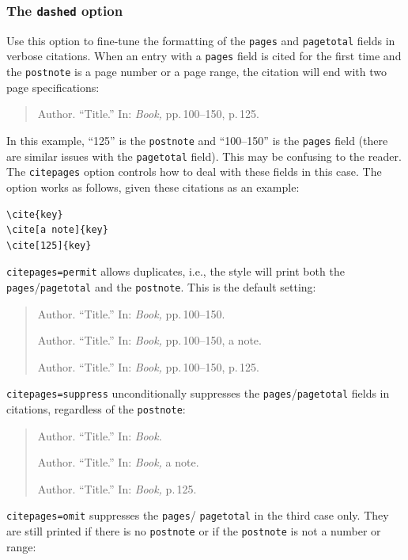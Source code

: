 \documentclass[a4paper]{article}
\begin{document}
\subsubsection*{The \texttt{dashed} option}

Use this option to fine-tune the formatting of the \texttt{pages}
and \texttt{pagetotal} fields in verbose citations. When an entry
with a \texttt{pages} field is cited for the first time and the
\texttt{postnote} is a page number or a page range, the citation
will end with two page specifications:

\begin{quote}
Author. \enquote{Title.} In: \emph{Book,} pp.\,100--150, p.\,125.
\end{quote}
%
In this example, \enquote{125} is the \texttt{postnote} and
\enquote{100--150} is the \texttt{pages} field (there are similar
issues with the \texttt{pagetotal} field). This may be confusing to
the reader. The \texttt{citepages} option controls how to deal with
these fields in this case. The option works as follows, given these
citations as an example:

\begin{verbatim}
\cite{key}
\cite[a note]{key}
\cite[125]{key}
\end{verbatim}
%
\texttt{citepages=permit} allows duplicates, i.e., the style will
print both the \texttt{pages}\slash \texttt{pagetotal} and the
\texttt{postnote}. This is the default setting:

\begin{quote}
Author. \enquote{Title.} In: \emph{Book,} pp.\,100--150.

Author. \enquote{Title.} In: \emph{Book,} pp.\,100--150, a note.

Author. \enquote{Title.} In: \emph{Book,} pp.\,100--150, p.\,125.
\end{quote}
%
\texttt{citepages=suppress} unconditionally suppresses the
\texttt{pages}\slash \texttt{pagetotal} fields in citations,
regardless of the \texttt{postnote}:

\begin{quote}
Author. \enquote{Title.} In: \emph{Book.}

Author. \enquote{Title.} In: \emph{Book,} a note.

Author. \enquote{Title.} In: \emph{Book,} p.\,125.
\end{quote}
%
\texttt{citepages=omit} suppresses the \texttt{pages}\slash
\texttt{pagetotal} in the third case only. They are still printed if
there is no \texttt{postnote} or if the \texttt{postnote} is not a
number or range:
\end{document}
